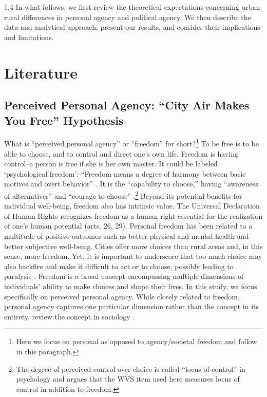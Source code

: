 \documentclass[10pt, letterpaper]{article}
\begin{document}
\begin{spacing}{1.4}
In what follows, we first review the theoretical expectations concerning urban-rural differences in personal agency and political agency. We then describe the data and analytical approach, present our results, and consider their implications and limitations.  

\section{Literature}
\subsection{Perceived Personal Agency: ``City Air Makes You Free'' Hypothesis  %
}
 
What is ``perceived personal agency'' or ``freedom'' for short?\footnote{Here we focus on personal as opposed to
  agency/societal freedom and follow \citet{aok_free_from_to} in this paragraph.} To be free is to be able to choose, and to control and direct one's own life. Freedom is having control--a person is free if she is her own master. It could be labeled `psychological freedom': ``Freedom means a degree of harmony between basic motives and overt behavior'' \citep[Bay 1970, p. 83 cited in][]{aok_free_from_to}.
 It is the ``capability to choose,'' having ``awareness of alternatives'' and ``courage to choose'' \citep{veenhoven00_b}.\footnote{The degree of perceived control over choice is called ``locus of control'' in psychology and \citet{verme09} argues that the WVS item used here measures locus of control in addition to freedom.}
  Beyond its potential benefits for individual well-being, freedom also has intrinsic value. 
 The Universal Declaration of Human Rights recognizes freedom as a human right essential for the realization of one's human potential (arts. 26, 29).
  Personal freedom has been related to a multitude of positive outcomes such as better physical and mental health and better subjective well-being. 
 Cities offer more choices than rural areas and, in this sense, more freedom. Yet, it is important to underscore that too much choice may also backfire and make it difficult to act or to choose, possibly leading to paralysis \citep{schwartz04}.
Freedom is a broad concept encompassing multiple dimensions of individuals' ability to make choices and shape their lives. In this study, we focus specifically on perceived personal agency. While closely related to freedom, personal agency captures one particular dimension rather than the concept in its entirety. 
\citet{hitlin09} review the concept in sociology  \citep[see also][]{agencyScale25}. %


\end{spacing}
\end{document}
